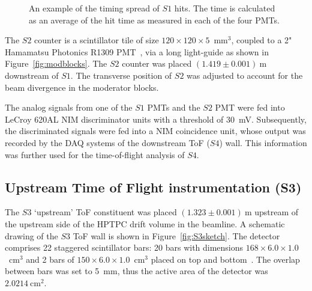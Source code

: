 \begin{figure}
  \begin{adjustbox}{width=0.7\linewidth, center}
    
  \end{adjustbox}
  \caption{An example of the timing spread of $\mathit{S1}$ hits. The time is calculated as an average of the hit time as measured in each of the four PMTs.}
  \label{fig:s1Res}
\end{figure}

The $\mathit{S2}$ counter is a scintillator tile of size $120\times120\times5$~mm$^3$, coupled to a 2" Hamamatsu Photonics R1309 PMT~\cite{Hamamatsu}, via a long light-guide as shown in Figure~\ref{fig:modblocks}.
The $\mathit{S2}$ counter was placed $(1.419 \pm 0.001)~\text{m}$ downstream of $\mathit{S1}$.
The transverse position of $\mathit{S2}$ was adjusted to account for the beam divergence in the moderator blocks.

The analog signals from one of the $\mathit{S1}$ PMTs and the $\mathit{S2}$ PMT were fed into LeCroy 620AL NIM discriminator units with a threshold of 30~mV.
Subsequently, the discriminated signals were fed into a NIM coincidence unit, whose output was recorded by the DAQ systems of the downstream ToF ($\mathit{S4}$) wall.
This information was further used for the time-of-flight analysis of $\mathit{S4}$.

\subsection{Upstream Time of Flight instrumentation (S3)}
\label{subsec:s3Exp}
The $\mathit{S3}$ `upstream' ToF constituent was placed $(1.323 \pm 0.001)~\text{m}$ upstream of the upstream side of the HPTPC drift volume in the beamline.
A schematic drawing of the $\mathit{S3}$ ToF wall is shown in Figure~\ref{fig:S3sketch}.
The detector comprises 22 staggered scintillator bars:  20 bars with dimensions $168 \times 6.0 \times 1.0$~cm$^3$ and 2 bars of  $150 \times 6.0 \times 1.0$~cm$^3$ placed on top and bottom~\cite{S3-proceedings}.
The overlap between bars was set to 5~mm, thus the active area of the detector was $2.0214~\text{cm}^{2}$.

